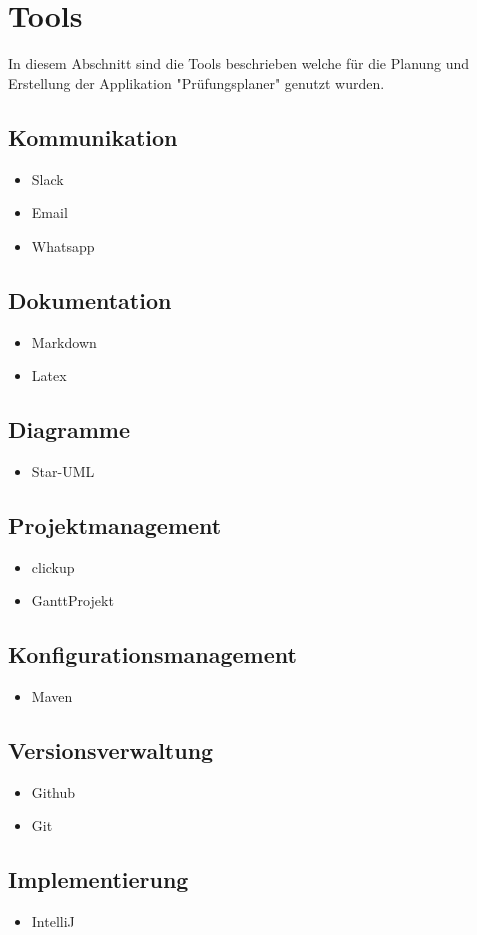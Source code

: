 \section{Tools}

In diesem Abschnitt sind die Tools beschrieben welche für die Planung und Erstellung der Applikation "Prüfungsplaner" genutzt wurden.

\subsection{Kommunikation} 
\begin{itemize}
	\item Slack
	\item Email
	\item Whatsapp
\end{itemize}
 
\subsection{Dokumentation}
\begin{itemize}
	\item Markdown
	\item Latex
\end{itemize} 

\subsection{Diagramme} 
\begin{itemize}
	\item Star-UML
\end{itemize}

\subsection{Projektmanagement}
\begin{itemize}
	\item clickup
	\item GanttProjekt
\end{itemize} 

\subsection{Konfigurationsmanagement} 
\begin{itemize}
	\item Maven
\end{itemize} 
  
\subsection{Versionsverwaltung}
\begin{itemize}
	\item Github
	\item Git
\end{itemize}
 
\subsection{Implementierung}
\begin{itemize}
	\item IntelliJ
\end{itemize}


